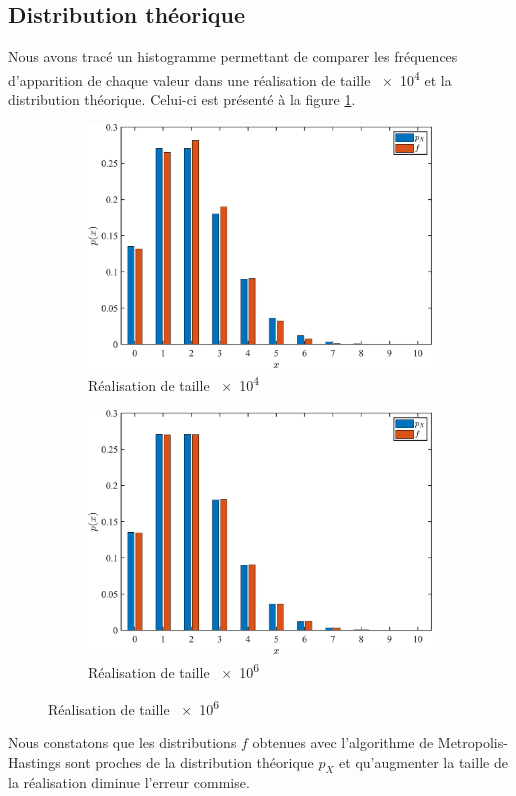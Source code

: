 \documentclass[a4paper, 12pt]{report}
\begin{document}
	\subsection{Distribution théorique}
	Nous avons tracé un histogramme permettant de comparer les fréquences d'apparition de chaque valeur dans une réalisation de taille \num{e4} et la distribution théorique. Celui-ci est présenté à la figure \ref{fig:histogram}. \par
	\begin{figure}[H]
	    \centering
	    \begin{subfigure}{0.48\textwidth}
	        \includegraphics[width=\textwidth]{resources/pdf/histogram_10000.pdf}
	        \caption{Réalisation de taille \num{e4}}
	    \end{subfigure}
	    \hspace{0.2em}
	    \begin{subfigure}{0.48\textwidth}
	        \includegraphics[width=\textwidth]{resources/pdf/histogram_1000000.pdf}
	        \caption{Réalisation de taille \num{e6}}
	    \end{subfigure}
	    \label{fig:histogram}
	\end{figure}
	Nous constatons que les distributions $f$ obtenues avec l'algorithme de Metropolis-Hastings sont proches de la distribution théorique $p_X$ et qu'augmenter la taille de la réalisation diminue l'erreur commise.
\end{document}
